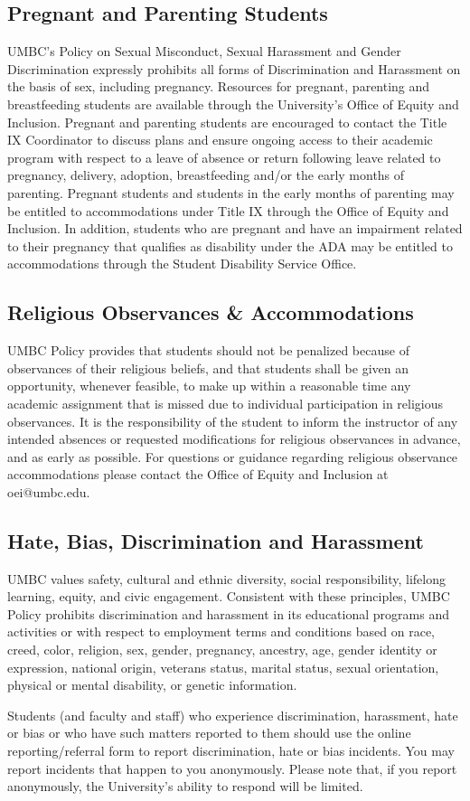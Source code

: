\documentclass[11pt]{article}
\begin{document}
\subsection*{Pregnant and Parenting Students}

UMBC’s Policy on Sexual Misconduct, Sexual Harassment and Gender Discrimination expressly prohibits all forms of Discrimination and Harassment on the basis of sex, including pregnancy. Resources for pregnant, parenting and breastfeeding students are available through the University’s Office of Equity and Inclusion.  Pregnant and parenting students are encouraged to contact the Title IX Coordinator to discuss plans and ensure ongoing access to their academic program with respect to a leave of absence or return following leave related to pregnancy, delivery, adoption, breastfeeding and/or the early months of parenting.
Pregnant students and students in the early months of parenting may be entitled to accommodations under Title IX through the Office of Equity and Inclusion.
In addition, students who are pregnant and have an impairment related to their pregnancy that qualifies as disability under the ADA may be entitled to accommodations through the Student Disability Service Office.
\subsection*{Religious Observances \& Accommodations}

UMBC Policy provides that students should not be penalized because of observances of their religious beliefs, and that students shall be given an opportunity, whenever feasible, to make up within a reasonable time any academic assignment that is missed due to individual participation in religious observances. It is the responsibility of the student to inform the instructor of any intended absences or requested modifications for religious observances in advance, and as early as possible. For questions or guidance regarding religious observance accommodations  please contact the Office of Equity and Inclusion at oei@umbc.edu.
\subsection*{Hate, Bias, Discrimination and Harassment}

UMBC values safety, cultural and ethnic diversity, social responsibility, lifelong learning, equity, and civic engagement.
Consistent with these principles, UMBC Policy prohibits discrimination and harassment in its educational programs and activities or with respect to employment terms and conditions based on race, creed, color, religion, sex, gender, pregnancy, ancestry, age, gender identity or expression, national origin, veterans status, marital status, sexual orientation, physical or mental disability, or genetic information.

Students (and faculty and staff) who experience discrimination, harassment, hate or bias or who have such matters reported to them should use the online reporting/referral form to report discrimination, hate or bias incidents. You may report incidents that happen to you anonymously. Please note that, if you report anonymously, the University’s ability to respond will be limited.
\end{document}
